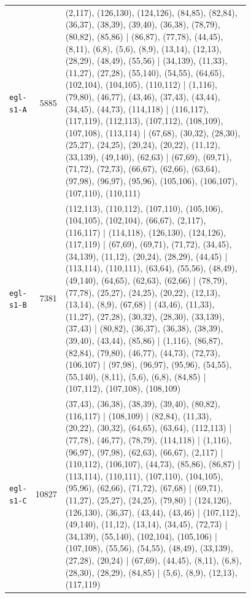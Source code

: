 \begin{landscape}
\begin{longtable}{lr>{\tiny\raggedright\arraybackslash}p{0.78\linewidth}}
\texttt{egl-s1-A} & 5885 & (2,117), (126,130), (124,126), (84,85), (82,84), (36,37), (38,39), (39,40), (36,38), (78,79), (80,82), (85,86) | (86,87), (77,78), (44,45), (8,11), (6,8), (5,6), (8,9), (13,14), (12,13), (28,29), (48,49), (55,56) | (34,139), (11,33), (11,27), (27,28), (55,140), (54,55), (64,65), (102,104), (104,105), (110,112) | (1,116), (79,80), (46,77), (43,46), (37,43), (43,44), (34,45), (44,73), (114,118) | (116,117), (117,119), (112,113), (107,112), (108,109), (107,108), (113,114) | (67,68), (30,32), (28,30), (25,27), (24,25), (20,24), (20,22), (11,12), (33,139), (49,140), (62,63) | (67,69), (69,71), (71,72), (72,73), (66,67), (62,66), (63,64), (97,98), (96,97), (95,96), (105,106), (106,107), (107,110), (110,111) \\[2pt]
\texttt{egl-s1-B} & 7381 & (112,113), (110,112), (107,110), (105,106), (104,105), (102,104), (66,67), (2,117), (116,117) | (114,118), (126,130), (124,126), (117,119) | (67,69), (69,71), (71,72), (34,45), (34,139), (11,12), (20,24), (28,29), (44,45) | (113,114), (110,111), (63,64), (55,56), (48,49), (49,140), (64,65), (62,63), (62,66) | (78,79), (77,78), (25,27), (24,25), (20,22), (12,13), (13,14), (8,9), (67,68) | (43,46), (11,33), (11,27), (27,28), (30,32), (28,30), (33,139), (37,43) | (80,82), (36,37), (36,38), (38,39), (39,40), (43,44), (85,86) | (1,116), (86,87), (82,84), (79,80), (46,77), (44,73), (72,73), (106,107) | (97,98), (96,97), (95,96), (54,55), (55,140), (8,11), (5,6), (6,8), (84,85) | (107,112), (107,108), (108,109) \\[2pt]
\texttt{egl-s1-C} & 10827 & (37,43), (36,38), (38,39), (39,40), (80,82), (116,117) | (108,109) | (82,84), (11,33), (20,22), (30,32), (64,65), (63,64), (112,113) | (77,78), (46,77), (78,79), (114,118) | (1,116), (96,97), (97,98), (62,63), (66,67), (2,117) | (110,112), (106,107), (44,73), (85,86), (86,87) | (113,114), (110,111), (107,110), (104,105), (95,96), (62,66), (71,72), (67,68) | (69,71), (11,27), (25,27), (24,25), (79,80) | (124,126), (126,130), (36,37), (43,44), (43,46) | (107,112), (49,140), (11,12), (13,14), (34,45), (72,73) | (34,139), (55,140), (102,104), (105,106) | (107,108), (55,56), (54,55), (48,49), (33,139), (27,28), (20,24) | (67,69), (44,45), (8,11), (6,8), (28,30), (28,29), (84,85) | (5,6), (8,9), (12,13), (117,119) \\[2pt]

\end{longtable}
\end{landscape}
